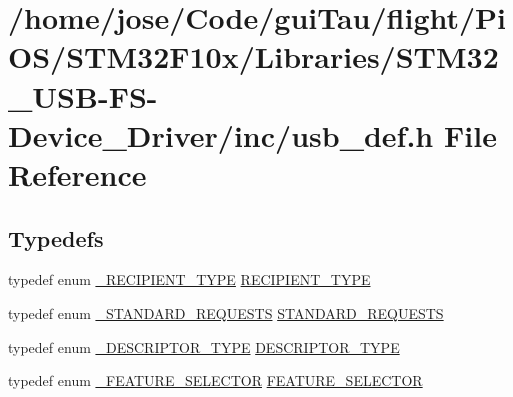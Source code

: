 \hypertarget{_s_t_m32_f10x_2_libraries_2_s_t_m32___u_s_b-_f_s-_device___driver_2inc_2usb__def_8h}{\section{/home/jose/\-Code/gui\-Tau/flight/\-Pi\-O\-S/\-S\-T\-M32\-F10x/\-Libraries/\-S\-T\-M32\-\_\-\-U\-S\-B-\/\-F\-S-\/\-Device\-\_\-\-Driver/inc/usb\-\_\-def.h File Reference}
\label{_s_t_m32_f10x_2_libraries_2_s_t_m32___u_s_b-_f_s-_device___driver_2inc_2usb__def_8h}
}
\subsection*{Typedefs}
\begin{DoxyCompactItemize}
\item 
typedef enum \hyperlink{_s_t_m32_f10x_2_libraries_2_s_t_m32___u_s_b-_f_s-_device___driver_2inc_2usb__def_8h_a772ce5a2cb37e07e7afe0cc5f5621efd}{\-\_\-\-R\-E\-C\-I\-P\-I\-E\-N\-T\-\_\-\-T\-Y\-P\-E} \hyperlink{_s_t_m32_f10x_2_libraries_2_s_t_m32___u_s_b-_f_s-_device___driver_2inc_2usb__def_8h_a9afe406f27f4d7e165be4ca601acb857}{R\-E\-C\-I\-P\-I\-E\-N\-T\-\_\-\-T\-Y\-P\-E}
\item 
typedef enum \hyperlink{_s_t_m32_f10x_2_libraries_2_s_t_m32___u_s_b-_f_s-_device___driver_2inc_2usb__def_8h_afe5511beefa80c0048acf5a493edebfc}{\-\_\-\-S\-T\-A\-N\-D\-A\-R\-D\-\_\-\-R\-E\-Q\-U\-E\-S\-T\-S} \hyperlink{_s_t_m32_f10x_2_libraries_2_s_t_m32___u_s_b-_f_s-_device___driver_2inc_2usb__def_8h_ac2c5dbb6be2fcddb0a0f6e2d909903bd}{S\-T\-A\-N\-D\-A\-R\-D\-\_\-\-R\-E\-Q\-U\-E\-S\-T\-S}
\item 
typedef enum \hyperlink{_s_t_m32_f10x_2_libraries_2_s_t_m32___u_s_b-_f_s-_device___driver_2inc_2usb__def_8h_a623e86b3f52ec5899f47f87a5ceb558a}{\-\_\-\-D\-E\-S\-C\-R\-I\-P\-T\-O\-R\-\_\-\-T\-Y\-P\-E} \hyperlink{_s_t_m32_f10x_2_libraries_2_s_t_m32___u_s_b-_f_s-_device___driver_2inc_2usb__def_8h_aa5ecce547a81dd6ff168f386597d5e0b}{D\-E\-S\-C\-R\-I\-P\-T\-O\-R\-\_\-\-T\-Y\-P\-E}
\item 
typedef enum \hyperlink{_s_t_m32_f10x_2_libraries_2_s_t_m32___u_s_b-_f_s-_device___driver_2inc_2usb__def_8h_a5018c8948e057aaabfbf7c3da6fc23b3}{\-\_\-\-F\-E\-A\-T\-U\-R\-E\-\_\-\-S\-E\-L\-E\-C\-T\-O\-R} \hyperlink{_s_t_m32_f10x_2_libraries_2_s_t_m32___u_s_b-_f_s-_device___driver_2inc_2usb__def_8h_a0a9652fff1d6a867af1d7c9d12edc2ee}{F\-E\-A\-T\-U\-R\-E\-\_\-\-S\-E\-L\-E\-C\-T\-O\-R}
\end{DoxyCompactItemize}
